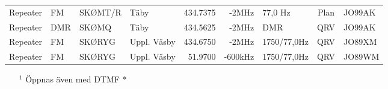 \documentclass[10pt,swedish,a4paper,twoside]{article}
\begin{document}
\begin{landscape}
\begin{longtable}{llllrrlcl}
	Repeater          & FM           & SKØMT/R       & Täby         &          434.7375 &          -2MHz & 77,0 Hz         &      Plan       & JO99AK           \\
	Repeater          & DMR          & SKØMQ         & Täby         &          434.5625 &          -2MHz & DMR             &       QRV       & JO99AK           \\
	Repeater          & FM           & SKØRYG        & Uppl. Väsby  &          434.6750 &          -2MHz & 1750/77,0Hz    &       QRV       & JO89XM           \\
	Repeater          & FM           & SKØRYG        & Uppl. Väsby  &           51.9700 &        -600kHz & 1750/77,0Hz    &       QRV       & JO89WM
\end{longtable}
\begin{itemize}
	\item[$^1$] Öppnas även med DTMF *
\end{itemize}
\normalsize
\end{landscape}






\end{document}
